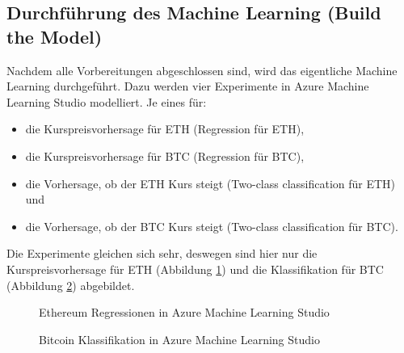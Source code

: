 \subsection{Durchführung des Machine Learning (Build the Model)}
Nachdem alle Vorbereitungen abgeschlossen sind, wird das eigentliche Machine Learning durchgeführt. Dazu werden vier Experimente in Azure Machine Learning Studio modelliert. Je eines für:
\begin{itemize}
\item die Kurspreisvorhersage für ETH (Regression für ETH),
\item die Kurspreisvorhersage für BTC (Regression für BTC),
\item die Vorhersage, ob der ETH Kurs steigt (Two-class classification für ETH) und
\item die Vorhersage, ob der BTC Kurs steigt (Two-class classification für BTC).
\end{itemize}
Die Experimente gleichen sich sehr, deswegen sind hier nur die Kurspreisvorhersage für ETH (Abbildung \ref{fig:azureETHReg}) und die Klassifikation für BTC (Abbildung \ref{fig:azureBTCClass}) abgebildet.

\begin{figure}[H]
\centering
{}
\caption{Ethereum Regressionen in Azure Machine Learning Studio}
\label{fig:azureETHReg}
\end{figure}

\begin{figure}[H]
\centering
{}
\caption{Bitcoin Klassifikation in Azure Machine Learning Studio}
\label{fig:azureBTCClass}
\end{figure}

